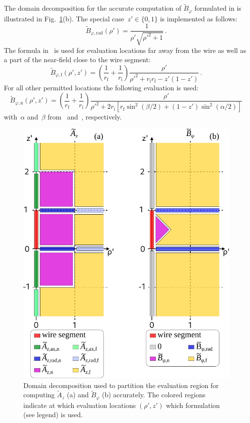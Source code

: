 The domain decomposition for the accurate computation of $\tilde{B}_\varphi$
formulated in  is illustrated in Fig.~\ref{fig:sws_regions}(b).
The special case~$z' \in \{0, 1\}$ is implemented as follows:
\begin{equation}
  \tilde{B}_{\varphi,\mathrm{rad}} (\rho') = \frac{1}{\rho' \sqrt{{\rho'}^2 + 1}} \, .
\end{equation}
The formula in~ is used for evaluation locations far away from the wire
as well as a part of the near-field close to the wire segment:
\begin{equation}
  \tilde{B}_{\varphi,\mathrm{f}} (\rho', z')
  = \left(\frac{1}{r_\mathrm{f}} + \frac{1}{r_\mathrm{i}} \right)
    \frac{\rho'}{{\rho'}^2 + r_\mathrm{i} r_\mathrm{f} - z' (1 - z')} \, .
\end{equation}
For all other permitted locations the following evaluation is used:
\begin{equation}
  \tilde{B}_{\varphi,\mathrm{n}} (\rho', z')
  = \left(\frac{1}{r_\mathrm{f}} + \frac{1}{r_\mathrm{i}} \right)
    \frac{\rho'}
         {{\rho'}^2 + 2 r_\mathrm{i} \left[ r_\mathrm{f} \sin^2(\beta/2) + (1 - z') \sin^2(\alpha/2) \right]}
\end{equation}
with~$\alpha$ and~$\beta$ from~ and~, respectively.
\begin{figure}[htbp]
    \centering
    \includegraphics{img/sws_regions.pdf}
    \caption{Domain decomposition used to partition the evaluation region
             for computing $\tilde{A}_z$ (a) and $\tilde{B}_\varphi$ (b) accurately.
             The colored regions indicate at which evaluation locations $(\rho',z')$
             which formulation (see legend) is used.}
    \label{fig:sws_regions}
\end{figure}


